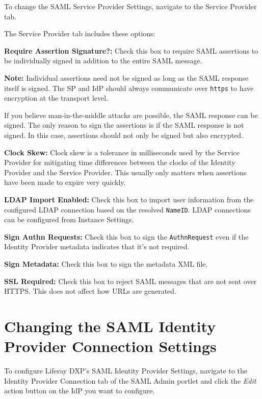 To change the SAML Service Provider Settings, navigate to the Service
Provider tab.

The Service Provider tab includes these options:

\textbf{Require Assertion Signature?:} Check this box to require SAML
assertions to be individually signed in addition to the entire SAML
message.

\noindent\hrulefill

\textbf{Note:} Individual assertions need not be signed as long as the
SAML response itself is signed. The SP and IdP should always communicate
over \texttt{https} to have encryption at the transport level.

If you believe man-in-the-middle attacks are possible, the SAML response
can be signed. The only reason to sign the assertions is if the SAML
response is not signed. In this case, assertions should not only be
signed but also encrypted.

\noindent\hrulefill

\textbf{Clock Skew:} Clock skew is a tolerance in milliseconds used by
the Service Provider for mitigating time differences between the clocks
of the Identity Provider and the Service Provider. This usually only
matters when assertions have been made to expire very quickly.

\textbf{LDAP Import Enabled:} Check this box to import user information
from the configured LDAP connection based on the resolved
\texttt{NameID}. LDAP connections can be configured from Instance
Settings.

\textbf{Sign Authn Requests:} Check this box to sign the
\texttt{AuthnRequest} even if the Identity Provider metadata indicates
that it's not required.

\textbf{Sign Metadata:} Check this box to sign the metadata XML file.

\textbf{SSL Required:} Check this box to reject SAML messages that are
not sent over HTTPS. This does not affect how URLs are generated.

\section{Changing the SAML Identity Provider Connection
Settings}\label{changing-the-saml-identity-provider-connection-settings}

To configure Liferay DXP's SAML Identity Provider Settings, navigate to
the Identity Provider Connection tab of the SAML Admin portlet and click
the \emph{Edit} action button on the IdP you want to configure.

